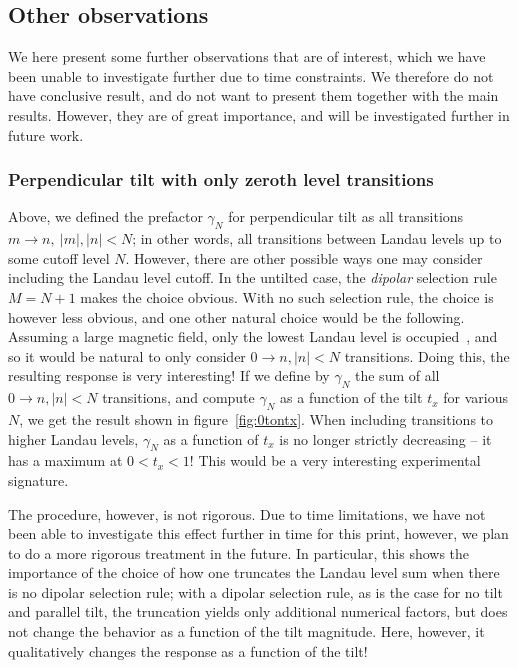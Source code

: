 \subsection{Other observations}\label{sec:other-observe}
We here present some further observations that are of interest, which we have been unable to investigate further due to time constraints.
We therefore do not have conclusive result, and do not want to present them together with the main results.
However, they are of great importance, and will be investigated further in future work.

\subsubsection{Perpendicular tilt with only zeroth level transitions}\label{sec:other-observe:zeroton}
Above, we defined the prefactor \( \gamma_N \) for perpendicular tilt as all transitions \( m\to n, \: |m|,|n| < N \);
in other words, all transitions between Landau levels up to some cutoff level \( N \).
However, there are other possible ways one may consider including the Landau level cutoff.
In the untilted case, the \emph{dipolar} selection rule \( M = N + 1 \) makes the choice obvious.
With no such selection rule, the choice is however less obvious, and one other natural choice would be the following.
Assuming a large magnetic field, only the lowest Landau level is occupied~\cite{chernodubThermalTransportGeometry2021}, and so it would be natural to only consider \( 0 \to n, |n| < N \) transitions.
Doing this, the resulting response is very interesting!
If we define by \( \gamma_N \) the sum of all \( 0\to n, |n| < N \) transitions, and compute \( \gamma_N \) as a function of the tilt \( t_x \) for various \( N \), we get the result shown in figure~\ref{fig:0tontx}.
When including transitions to higher Landau levels, \( \gamma_N \) as a function of \( t_x \) is no longer strictly decreasing -- it has a maximum at \( 0 < t_x < 1 \)!
This would be a very interesting experimental signature.

The procedure, however, is not rigorous.
Due to time limitations, we have not been able to investigate this effect further in time for this print, however, we plan to do a more rigorous treatment in the future.
In particular, this shows the importance of the choice of how one truncates the Landau level sum when there is no dipolar selection rule;
with a dipolar selection rule, as is the case for no tilt and parallel tilt, the truncation yields only additional numerical factors, but does not change the behavior as a function of the tilt magnitude.
Here, however, it qualitatively changes the response as a function of the tilt!

